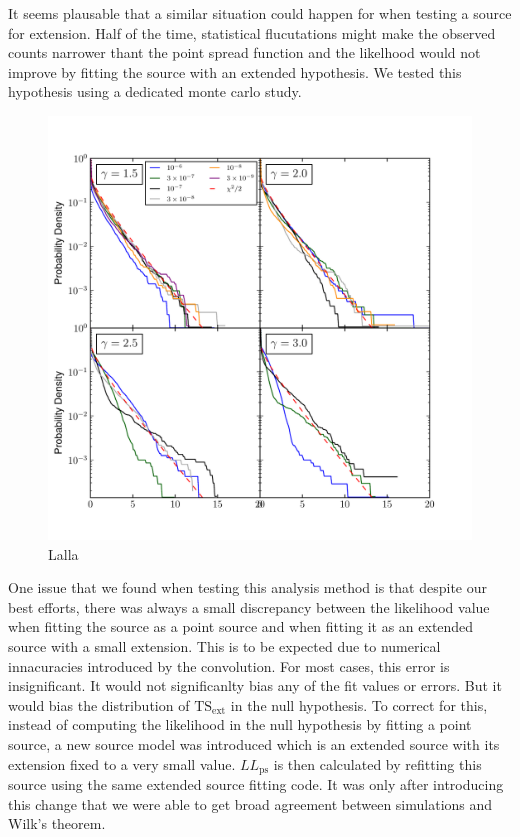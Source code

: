 \documentclass[12pt]{article}
\begin{document}
It seems plausable that a similar situation could happen for when 
testing a source for extension. Half of the time, statistical flucutations
might make the observed counts narrower thant the point spread function
and the likelhood would not improve by fitting the source with an extended
hypothesis. We tested this hypothesis using a dedicated monte carlo study.

\begin{figure}
\includegraphics{mc_plots/ts_ext_emin_1000.pdf}
\caption{Lalla}
\end{figure}

One issue that we found when testing this analysis method is that
despite our best efforts, there was always a small discrepancy between
the likelihood value when fitting the source as a point source and when
fitting it as an extended source with a small extension.  This is to be
expected due to numerical innacuracies introduced by the convolution.
For most cases, this error is insignificant. It would not significanlty
bias any of the fit values or errors. But it would bias the distribution
of $\text{TS}_\text{ext}$ in the null hypothesis. To correct for this,
instead of computing the likelihood in the null hypothesis by fitting
a point source, a new source model was introduced which is an extended
source with its extension fixed to a very small value. $LL_\text{ps}$
is then calculated by refitting this source using the same extended
source fitting code. It was only after introducing this change that we
were able to get broad agreement between simulations and Wilk's theorem.
\end{document}

